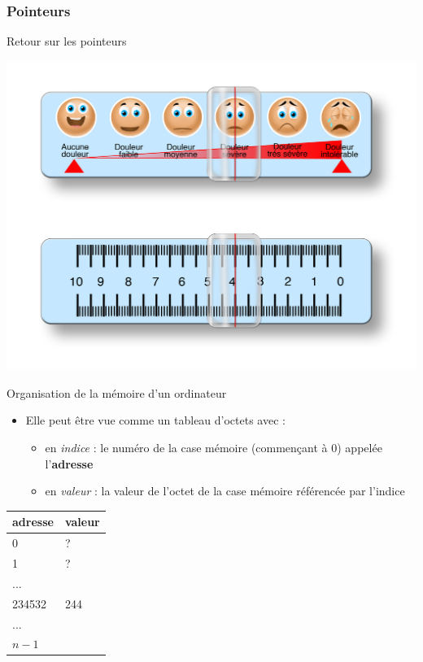 
\subsubsection{Pointeurs}

\begin{frame}{Retour sur les pointeurs}
\begin{center}
\includegraphics[height=.8\textheight]{fig/echelle-douleur.jpg}
\end{center}
\end{frame}

\begin{frame}{Organisation de la mémoire d'un ordinateur}
\begin{itemize}
\item Elle peut être vue comme un tableau d'octets avec :
\begin{itemize}
\item en \textit{indice} : le numéro de la case mémoire (commençant à 0) appelée l'\textbf{adresse}
\item en \textit{valeur} : la valeur de l'octet de la case mémoire référencée par l'indice
\end{itemize}
\end{itemize}
\begin{center}
\begin{tabular}{|l|l|}
\hline \textbf{adresse} & \textbf{valeur} \\
\hline 0 & ? \\
1 & ? \\
... & \\
234532 & 244 \\
... & \\
$n-1$ & \\
\hline
\end{tabular}
\end{center}
\end{frame}

